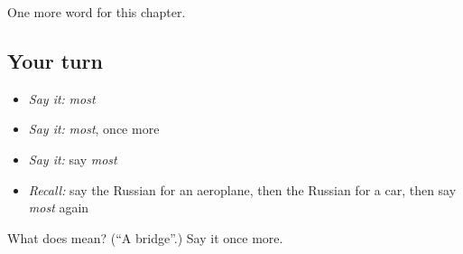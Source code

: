 \begin{grammarlens}[title={What you've built}]
One more word for this chapter.
\end{grammarlens}

\subsection*{Your turn}
\begin{itemize}
\raggedright
  \item \emph{Say it:} \emph{most}
  \item \emph{Say it:} \emph{most}, once more
  \item \emph{Say it:} say \emph{most}
  \item \emph{Recall:} say the Russian for an aeroplane, then the Russian for a car, then say \emph{most} again
\end{itemize}

\begin{tcolorbox}[breakable,colback=teal!4,colframe=teal!35!black,title={Before you move on}]
What does  mean? (\textquotedblleft{}A bridge\textquotedblright{}.) Say it once more.
\end{tcolorbox}
